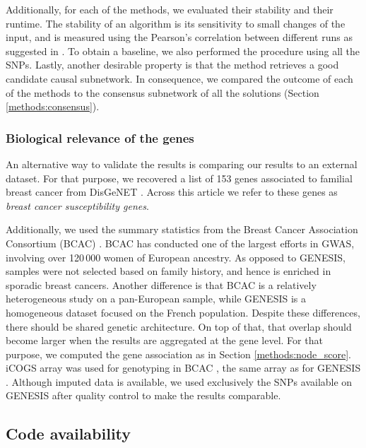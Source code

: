 \documentclass[twocolumn, 10pt]{article}
\begin{document}
Additionally, for each of the methods, we evaluated their stability and their runtime. The stability of an algorithm is its sensitivity to small changes of the input, and is measured using the Pearson's correlation between different runs as suggested in \cite{nogueira_measuring_2016}. To obtain a baseline, we also performed the procedure using all the SNPs. Lastly, another desirable property is that the method retrieves a good candidate causal subnetwork. In consequence, we compared the outcome of each of the methods to the consensus subnetwork of all the solutions (Section \ref{methods:consensus}).

\subsubsection{Biological relevance of the genes}
\label{methods:bcac}
An alternative way to validate the results is comparing our results to an external dataset. For that purpose, we recovered a list of 153 genes associated to familial breast cancer from DisGeNET \cite{pinero_disgenet:_2017}. Across this article we refer to these genes as \emph{breast cancer susceptibility genes}.

Additionally, we used the summary statistics from the Breast Cancer Association Consortium (BCAC) \cite{michailidou_genome-wide_2015}. BCAC has conducted one of the largest efforts in GWAS, involving over 120\,000 women of European ancestry. As opposed to GENESIS, samples were not selected based on family history, and hence is enriched in sporadic breast cancers. Another difference is that BCAC is a relatively heterogeneous study on a pan-European sample, while GENESIS is a homogeneous dataset focused on the French population. Despite these differences, there should be shared genetic architecture. On top of that, that overlap should become larger when the results are aggregated at the gene level. For that purpose, we computed the gene association as in Section \ref{methods:node_score}. iCOGS array was used for genotyping in BCAC \cite{sakoda_turning_2013}, the same array as for GENESIS \cite{sinilnikova_genesis:_2016}. Although imputed data is available, we used exclusively the SNPs available on GENESIS after quality control to make the results comparable.

\subsection{Code availability}
\label{sec:org1d907c0}
\end{document}
